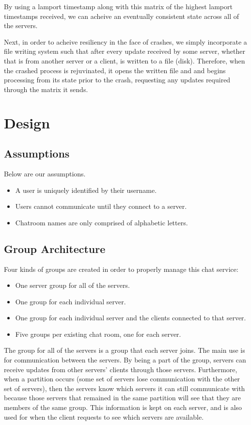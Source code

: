 \documentclass[12pt,journal,compsoc]{IEEEtran}
\begin{document}
By using a lamport timestamp along with this matrix of the highest lamport timestamps received, we can acheive an eventually consistent state across all of the servers.

Next, in order to acheive resiliency in the face of crashes, we simply incorporate a file writing system such that after every update received by some server, whether that is from another server or a client, is written to a file (disk). Therefore, when the crashed process is rejuvinated, it opens the written file and and begins processing from its state prior to the crash, requesting any updates required through the matrix it sends.

\section{Design}
\subsection{Assumptions}
Below are our assumptions.
\begin{itemize}
\item A user is uniquely identified by their username.
\item Users cannot communicate until they connect to a server.
\item Chatroom names are only comprised of alphabetic letters.
\end{itemize}
\subsection{Group Architecture}
Four kinds of groups are created in order to properly manage this chat service:
\begin{itemize}
\item One server group for all of the servers.
\item One group for each individual server.
\item One group for each individual server and the clients connected to that server.
\item Five groups per existing chat room, one for each server.
\end{itemize}

The group for all of the servers is a group that each server joins. The main use is for communication between the servers. By being a part of the group, servers can receive updates from other servers' clients through those servers. Furthermore, when a partition occurs (some set of servers lose communication with the other set of servers), then the servers know which servers it can still communicate with because those servers that remained in the same partition will see that they are members of the same group.  This information is kept on each server, and is also used for when the client requests to see which servers are available.
\end{document}
